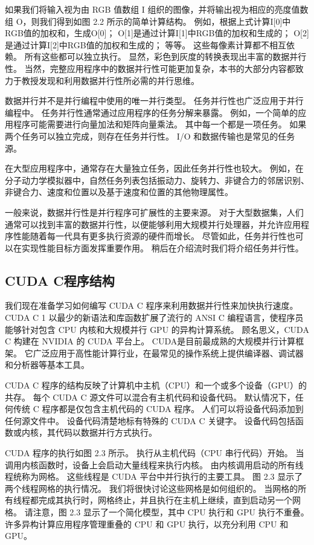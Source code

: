 如果我们将输入视为由 RGB 值数组 I 组织的图像，并将输出视为相应的亮度值数组 O，则我们得到如图 2.2 所示的简单计算结构。 例如，根据上式计算I[0]中RGB值的加权和，生成O[0]； O[1]是通过计算I[1]中RGB值的加权和生成的； O[2]是通过计算I[2]中RGB值的加权和生成的； 等等。 这些每像素计算都不相互依赖。 所有这些都可以独立执行。 显然，彩色到灰度的转换表现出丰富的数据并行性。 当然，完整应用程序中的数据并行性可能更加复杂，本书的大部分内容都致力于教授发现和利用数据并行性所必需的并行思维。

\begin{remark}[任务并行与数据并行]
数据并行并不是并行编程中使用的唯一并行类型。 任务并行性也广泛应用于并行编程中。 任务并行性通常通过应用程序的任务分解来暴露。 例如，一个简单的应用程序可能需要进行向量加法和矩阵向量乘法。 其中每一个都是一项任务。 如果两个任务可以独立完成，则存在任务并行性。 I/O 和数据传输也是常见的任务源。

在大型应用程序中，通常存在大量独立任务，因此任务并行性也较大。 例如，在分子动力学模拟器中，自然任务列表包括振动力、旋转力、非键合力的邻居识别、非键合力、速度和位置以及基于速度和位置的其他物理属性。

一般来说，数据并行性是并行程序可扩展性的主要来源。 对于大型数据集，人们通常可以找到丰富的数据并行性，以便能够利用大规模并行处理器，并允许应用程序性能随着每一代具有更多执行资源的硬件而增长。 尽管如此，任务并行性也可以在实现性能目标方面发挥重要作用。 稍后在介绍流时我们将介绍任务并行性。
\end{remark}

\subsection{CUDA C程序结构}
我们现在准备学习如何编写 CUDA C 程序来利用数据并行性来加快执行速度。 CUDA C 1 以最少的新语法和库函数扩展了流行的 ANSI C 编程语言，使程序员能够针对包含 CPU 内核和大规模并行 GPU 的异构计算系统。 顾名思义，CUDA C 构建在 NVIDIA 的 CUDA 平台上。 CUDA是目前最成熟的大规模并行计算框架。 它广泛应用于高性能计算行业，在最常见的操作系统上提供编译器、调试器和分析器等基本工具。

CUDA C 程序的结构反映了计算机中主机（CPU）和一个或多个设备（GPU）的共存。 每个 CUDA C 源文件可以混合有主机代码和设备代码。 默认情况下，任何传统 C 程序都是仅包含主机代码的 CUDA 程序。 人们可以将设备代码添加到任何源文件中。 设备代码清楚地标有特殊的 CUDA C 关键字。 设备代码包括函数或内核，其代码以数据并行方式执行。

CUDA 程序的执行如图 2.3 所示。 执行从主机代码（CPU 串行代码）开始。 当调用内核函数时，设备上会启动大量线程来执行内核。 由内核调用启动的所有线程统称为网格。 这些线程是 CUDA 平台中并行执行的主要工具。 图 2.3 显示了两个线程网格的执行情况。 我们将很快讨论这些网格是如何组织的。 当网格的所有线程都完成其执行时，网格终止，并且执行在主机上继续，直到启动另一个网格。 请注意，图 2.3 显示了一个简化模型，其中 CPU 执行和 GPU 执行不重叠。 许多异构计算应用程序管理重叠的 CPU 和 GPU 执行，以充分利用 CPU 和 GPU。

